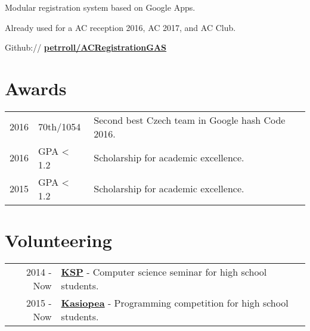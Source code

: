 \documentclass[a4paper]{deedy-resume} %
\begin{document}
\begin{minipage}[t]{0.66\textwidth}
\emptyLocation %
\begin{tightitemize}
\item Modular registration system based on Google Apps.
\item Already used for a AC reception 2016, AC 2017, and AC Club.
\item Github:// \href{https://github.com/petrroll/ACRegistrationGAS}{\bf petrroll/ACRegistrationGAS}
\end{tightitemize}

\sectionspace %


\section{Awards} 

\begin{tabular}{rll}
2016 & 70th/1054 & Second best Czech team in Google hash Code 2016. \\
2016 & GPA < 1.2 & Scholarship for academic excellence. \\
2015 & GPA < 1.2 & Scholarship for academic excellence. \\
\end{tabular}

\sectionspace %


\section{Volunteering} 

\begin{tabular}{rll}
2014 - Now & \href{https://ksp.mff.cuni.cz/}{\bf KSP} - Computer science seminar for high school students. \\
2015 - Now & \href{https://kasiopea.matfyz.cz/}{\bf Kasiopea} - Programming competition for high school students. \\
\end{tabular}

\sectionspace %


\end{minipage} %
\end{document}

